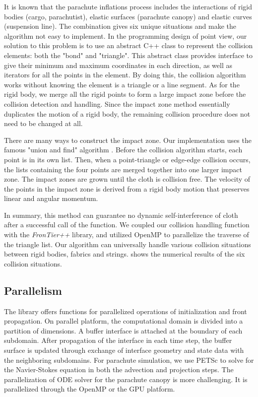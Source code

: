 It is known that the parachute inflations process includes the interactions of rigid bodies (cargo, parachutist), elastic surfaces (parachute canopy) and elastic curves (suspension line). The combination gives six unique situations and make the algorithm not easy to implement. In the programming design of point view, our solution to this problem is to use an abstract C++ class to represent the collision elements: both the "bond" and "triangle". This abstract class provides interface to give their minimum and maximum coordinates in each direction, as well as iterators for all the points in the element. By doing this, the collision algorithm works without knowing the element is a triangle or a line segment. As for the rigid body, we merge all the rigid points to form a large impact zone before the collision detection and handling. Since the impact zone method essentially duplicates the motion of a rigid body, the remaining collision procedure does not need to be changed at all. 

There are many ways to construct the impact zone. Our implementation uses the famous "union and find" algorithm \cite{}. Before the collision algorithm starts, each point is in its own list. Then, when a point-triangle or edge-edge collision occurs, the lists containing the four points are merged together into one larger impact zone. The impact zones are grown until the cloth is collision free. The velocity of the points in the impact zone is derived from a rigid body motion that preserves linear and angular momentum.

In summary, this method can guarantee no dynamic self-interference of cloth after a successful call of the function. We coupled our collision handling function with the {\it
FronTier++} library, and utilized OpenMP to parallelize the traverse of the triangle
list. Our algorithm can universally handle various collision situations between rigid bodies, fabrics and strings.  shows the numerical results of the six collision situations.

\subsection{Parallelism} 
The \FronTierp library offers functions for parallelized
operations of initialization and front propagation. On parallel platform, the
computational domain is divided into a partition of dimensions. A buffer
interface is attached at the boundary of each subdomain. After propagation of
the interface in each time step, the buffer surface is updated through exchange
of interface geometry and state data with the neighboring subdomains. For
parachute simulation, we use PETSc to solve for the Navier-Stokes equation in
both the advection and projection steps.  The parallelization of ODE solver for
the parachute canopy is more challenging.  It is parallelized through the OpenMP
or the GPU platform.

